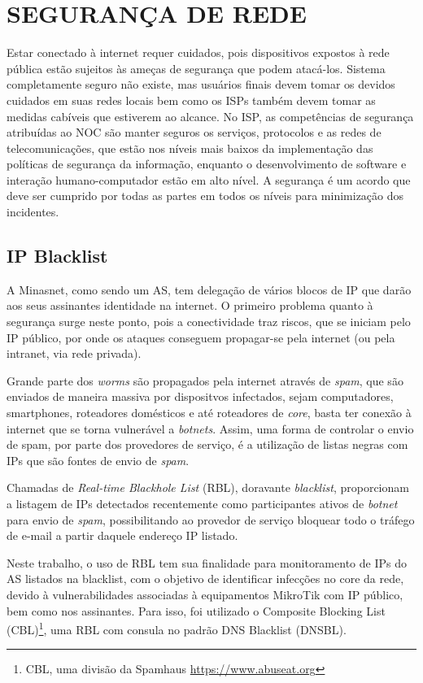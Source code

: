 \chapter{SEGURANÇA DE REDE}

    Estar conectado à internet requer cuidados, pois dispositivos expostos à rede pública estão sujeitos às ameças de segurança que podem atacá-los. Sistema completamente seguro não existe, mas usuários finais devem tomar os devidos cuidados em suas redes locais bem como os ISPs também devem tomar as medidas cabíveis que estiverem ao alcance. No ISP, as competências de segurança atribuídas ao NOC são manter seguros os serviços, protocolos e as redes de telecomunicações, que estão nos níveis mais baixos da implementação das políticas de segurança da informação, enquanto o desenvolvimento de software e interação humano-computador estão em alto nível. A segurança é um acordo que deve ser cumprido por todas as partes em todos os níveis para minimização dos incidentes.

\section{IP Blacklist}

    A Minasnet, como sendo um AS, tem delegação de vários blocos de IP que darão aos seus assinantes identidade na internet. O primeiro problema quanto à segurança surge neste ponto, pois a conectividade traz riscos, que se iniciam pelo IP público, por onde os ataques conseguem propagar-se pela internet (ou pela intranet, via rede privada).
    
    Grande parte dos \textit{worms} são propagados pela internet através de \textit{spam}, que são enviados de maneira massiva por dispositvos infectados, sejam computadores, smartphones, roteadores domésticos e até roteadores de \textit{core}, basta ter conexão à internet que se torna vulnerável a \textit{botnets}. Assim, uma forma de controlar o envio de spam, por parte dos provedores de serviço, é a utilização de listas negras com IPs que são fontes de envio de \textit{spam}.
    
    Chamadas de \textit{Real-time Blackhole List} (RBL), doravante \textit{blacklist}, proporcionam a listagem de IPs detectados recentemente como participantes ativos de \textit{botnet} para envio de \textit{spam}, possibilitando ao provedor de serviço bloquear todo o tráfego de e-mail a partir daquele endereço IP listado. 
    
    Neste trabalho, o uso de RBL tem sua finalidade para monitoramento de IPs do AS listados na blacklist, com o objetivo de identificar infecções no core da rede, devido à vulnerabilidades associadas à equipamentos MikroTik com IP público, bem como nos assinantes. Para isso, foi utilizado o Composite Blocking List (CBL)\footnote{CBL, uma divisão da Spamhaus \url{https://www.abuseat.org}}, uma RBL com consula no padrão DNS Blacklist (DNSBL).
    
